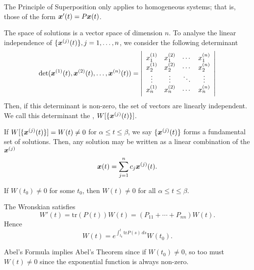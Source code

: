 \begin{remark}
	The Principle of Superposition only applies to homogeneous systems; that is, those of the form $\bm{x}'(t) = P\bm{x}(t)$.
\end{remark}

The space of solutions is a vector space of dimension $n$. To analyse the linear independence of $\{\bm{x}^{(j)}(t)\}, j = 1, \ldots, n$, we consider the following determinant
\begin{equation}\label{eq:wronskian}
	\det(\bm{x}^{(1)}(t), \bm{x}^{(2)}(t), \ldots, \bm{x}^{(n)}(t)) = \left| \begin{array}{cccc} x_1^{(1)} & x_1^{(2)} & \cdots & x_1^{(n)} \\ x_2^{(1)} & x_2^{(2)} & \cdots & x_2^{(n)} \\ \vdots & \vdots & \ddots & \vdots \\ x_n^{(1)} & x_n^{(2)} & \cdots & x_n^{(n)}
	\end{array} \right|
\end{equation}
Then, if this determinant is non-zero, the set of vectors are linearly independent. We call this determinant the , $W[\{\bm{x}^{(j)}(t)\}]$.

\begin{theorem}\label{thrm:fundamentalset}
	If $W[\{\bm{x}^{(j)}(t)\}] = W(t) \neq 0$ for $\alpha \leq t \leq \beta$, we say $\{\bm{x}^{(j)}(t)\}$ forms a fundamental set of solutions. Then, any solution may be written as a linear combination of the $\bm{x}^{(j)}$
	\[
	\bm{x}(t) = \sum_{j=1}^n c_j \bm{x}^{(j)}(t).
	\]
\end{theorem}

\begin{theorem}
	If $W(t_0) \neq 0$ for some $t_0$, then $W(t) \neq 0$ for all $\alpha \leq t \leq \beta$.
\end{theorem}

\begin{theorem}
	The Wronskian satisfies
	\[
	W'(t) = \text{tr}(P(t)) W(t) = (P_{11} + \cdots + P_{nn}) W(t).
	\]
	Hence
	\[
	W(t) = e^{\int_{t_0}^t \text{tr} P(s) \,ds} W(t_0).
	\]
\end{theorem}

\begin{remark}
	Abel's Formula implies Abel's Theorem since if $W(t_0) \neq 0$, so too must $W(t) \neq 0$ since the exponential function is always non-zero.
\end{remark}

